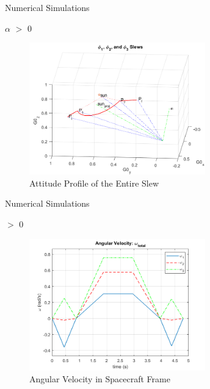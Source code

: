 \documentclass{beamer}
\begin{document}
\begin{frame}{Numerical Simulations}
	\begin{block}{$\alpha$ $>$ 0}
		\begin{figure}[H]
			\label{fig:phi1_phi2_phi3}
			\includegraphics[width=3in]{figures/alphaNot0/phi1_phi2_phi3.png}
			\caption{Attitude Profile of the Entire Slew}
		\end{figure}
	\end{block}
\end{frame}
\begin{frame}{Numerical Simulations}
	\begin{block}{\alpha $>$ 0}
		
		\begin{figure}
			\centering
				\label{fig:ang_vel_phi_total}
					\includegraphics[width=3in]{figures/alphaNot0/ang_vel_phi_total.png}
				\caption{Angular Velocity in Spacecraft Frame}
		\end{figure}


	\end{block}
\end{frame}
\end{document}
